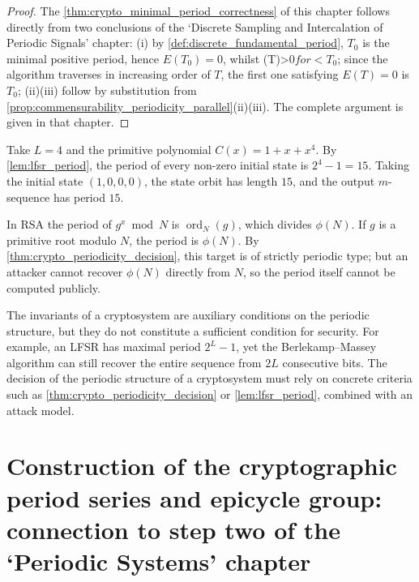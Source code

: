 \begin{proof}
The \cref{thm:crypto_minimal_period_correctness} of this chapter follows directly from two conclusions of the `Discrete Sampling and Intercalation of Periodic Signals' chapter:
(i) by \cref{def:discrete_fundamental_period}, $T_0$ is the minimal positive period, hence $E(T_0)=0$, whilst (T)>0$ for <T_0$;
since the algorithm traverses in increasing order of $T$, the first one satisfying $E(T)=0$ is $T_0$;
(ii)(iii) follow by substitution from \cref{prop:commensurability_periodicity_parallel}(ii)(iii). The complete argument is given in that chapter.
\end{proof}

\begin{example}\label{ex:crypto_lfsr_period}
Take \(L=4\) and the primitive polynomial \(C(x)=1+x+x^4\). By \cref{lem:lfsr_period}, the period of every non-zero initial state is \(2^4-1=15\). Taking the initial state \((1,0,0,0)\), the state orbit has length \(15\), and the output \(m\)-sequence has period \(15\).
\end{example}

\begin{example}\label{ex:rsa_period}
In RSA the period of \(g^x\bmod N\) is \(\operatorname{ord}_N(g)\), which divides \(\phi(N)\). If \(g\) is a primitive root modulo \(N\), the period is \(\phi(N)\). By \cref{thm:crypto_periodicity_decision}, this target is of strictly periodic type; but an attacker cannot recover \(\phi(N)\) directly from \(N\), so the period itself cannot be computed publicly.
\end{example}

\begin{remark}\label{rem:crypto_invariant_not_period}
The invariants of a cryptosystem are auxiliary conditions on the periodic structure, but they do not constitute a sufficient condition for security. For example, an LFSR has maximal period \(2^L-1\), yet the Berlekamp--Massey algorithm can still recover the entire sequence from \(2L\) consecutive bits. The decision of the periodic structure of a cryptosystem must rely on concrete criteria such as \cref{thm:crypto_periodicity_decision} or \cref{lem:lfsr_period}, combined with an attack model.
\end{remark}

\section{Construction of the cryptographic period series and epicycle group: connection to step two of the `Periodic Systems' chapter}
\label{sec:crypto_series_construction}

